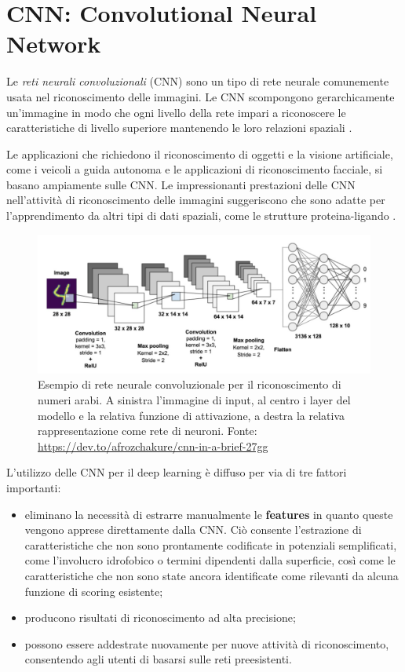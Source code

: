 \section{CNN: Convolutional Neural Network}

Le \textit{reti neurali convoluzionali} (CNN) sono un tipo di rete neurale comunemente usata nel riconoscimento delle immagini. Le CNN scompongono gerarchicamente un'immagine in modo che ogni livello della rete impari a riconoscere le caratteristiche di livello superiore mantenendo le loro relazioni spaziali \cite{ragoza_protein-ligand_2017}.

Le applicazioni che richiedono il riconoscimento di oggetti e la visione artificiale, come i veicoli a guida autonoma e le applicazioni di riconoscimento facciale, si basano ampiamente sulle CNN.
Le impressionanti prestazioni delle CNN nell'attività di riconoscimento delle immagini suggeriscono che sono adatte per l'apprendimento da altri tipi di dati spaziali, come le strutture proteina-ligando \cite{ragoza_protein-ligand_2017}. 

\begin{figure}[H]
    \centering
    \includegraphics[scale=0.55]{images/chapter2/convNet.jpg}
    \caption[Esempio di CNN per il riconoscimento di numeri arabi.]{Esempio di rete neurale convoluzionale per il riconoscimento di numeri arabi. A sinistra l'immagine di input, al centro i layer del modello e la relativa funzione di attivazione, a destra la relativa rappresentazione come rete di neuroni. Fonte: \url{https://dev.to/afrozchakure/cnn-in-a-brief-27gg}}
    \label{fig:conv_net}
\end{figure}

L’utilizzo delle CNN per il deep learning è diffuso per via di tre fattori importanti:
\begin{itemize}
    \item eliminano la necessità di estrarre manualmente le \textbf{features} in quanto queste vengono apprese direttamente dalla CNN. Ciò consente l'estrazione di caratteristiche che non sono prontamente codificate in potenziali semplificati, come l'involucro idrofobico o termini dipendenti dalla superficie, così come le caratteristiche che non sono state ancora identificate come rilevanti da alcuna funzione di scoring esistente;
    \item producono risultati di riconoscimento ad alta precisione;
    \item possono essere addestrate nuovamente per nuove attività di riconoscimento, consentendo agli utenti di basarsi sulle reti preesistenti.
\end{itemize}

